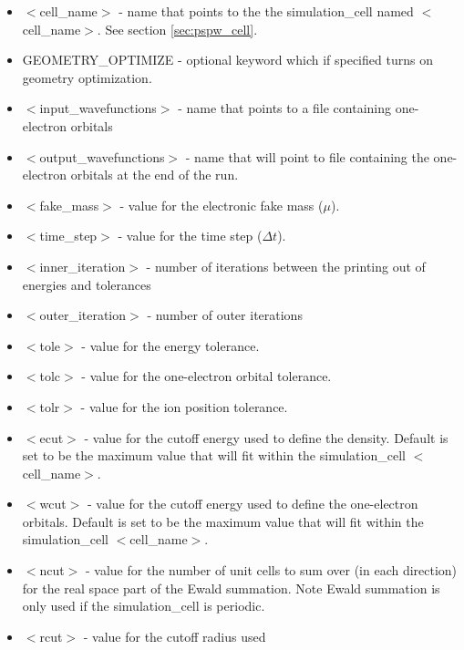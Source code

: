 \begin{itemize}
        \item $<$cell\_name$>$ - name that points to the
              the simulation\_cell named $<$cell\_name$>$. See section \ref{sec:pspw_cell}.
        \item GEOMETRY\_OPTIMIZE - optional keyword which if specified
              turns on geometry optimization.   
        \item $<$input\_wavefunctions$>$ - name that points
              to a file containing one-electron orbitals
        \item $<$output\_wavefunctions$>$ - name that will
              point to file containing the one-electron orbitals at the
              end of the run. 
        \item $<$fake\_mass$>$ - value for the electronic
              fake mass ($\mu$).
        \item $<$time\_step$>$ - value for the time step ($\Delta t$).
        \item $<$inner\_iteration$>$ - number of iterations between the 
              printing out of energies and tolerances
        \item $<$outer\_iteration$>$ - number of outer iterations
        \item $<$tole$>$ - value for the energy tolerance.
        \item $<$tolc$>$ - value for the one-electron orbital tolerance.
        \item $<$tolr$>$ - value for the ion position tolerance.
        \item $<$ecut$>$ - value for the cutoff energy used
                           to define the density.  Default is set
                           to be the maximum value that will fit
                           within the simulation\_cell $<$cell\_name$>$.
        \item $<$wcut$>$ - value for the cutoff energy used
                           to define the one-electron orbitals. Default is set
                           to be the maximum value that will fit
                           within the simulation\_cell $<$cell\_name$>$.
        \item $<$ncut$>$ - value for the number of unit cells
                          to sum over (in each direction) for the real space
                          part of the Ewald summation.  Note Ewald summation
                          is only used if the simulation\_cell is periodic.
        \item $<$rcut$>$ - value for the cutoff radius used

\end{itemize}
